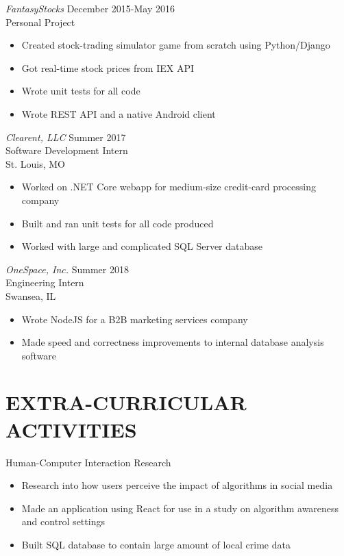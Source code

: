 \documentclass[margin]{res}
\begin{document}
\begin{resume}
             {\sl FantasyStocks} \hfill December 2015-May 2016 \\
             Personal Project 
            \begin{itemize} \itemsep -2pt %
                \item Created stock-trading simulator game from scratch using Python/Django
                \item Got real-time stock prices from IEX API
                \item Wrote unit tests for all code
                \item Wrote REST API and a native Android client
            \end{itemize}
 
                {\sl Clearent, LLC } \hfill            Summer 2017 \\
                Software Development Intern \\
                St. Louis, MO
                 \begin{itemize}  \itemsep -2pt %
                 \item Worked on .NET Core webapp for medium-size credit-card processing company
                 \item Built and ran unit tests for all code produced
                 \item Worked with large and complicated SQL Server database
                 \end{itemize} 

                {\sl OneSpace, Inc.} \hfill        Summer 2018 \\
                Engineering Intern \\
                Swansea, IL
                \begin{itemize} \itemsep -2pt %
                    \item Wrote NodeJS for a B2B marketing services company
                    \item Made speed and correctness improvements to internal database analysis software
                \end{itemize} 

\section{EXTRA-CURRICULAR \\ ACTIVITIES}             
                Human-Computer Interaction Research
                \begin{itemize} \itemsep -2pt %
                    \item Research into how users perceive the impact of algorithms in social media
                    \item Made an application using React for use in a study on algorithm awareness and control settings
                    \item Built SQL database to contain large amount of local crime data
                \end{itemize}



\end{resume}
\end{document}
